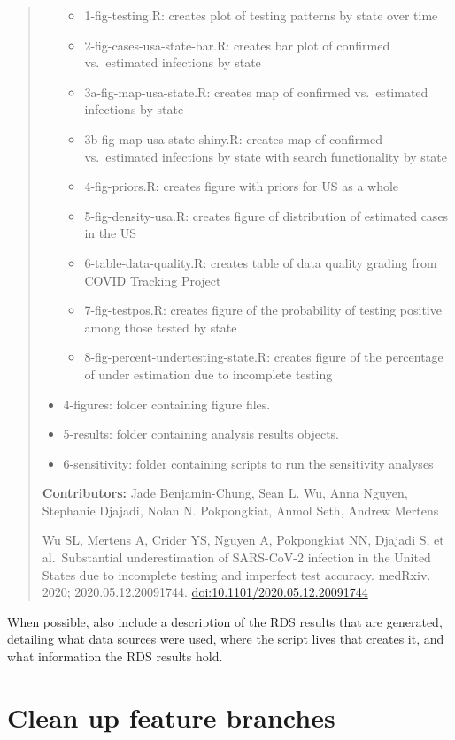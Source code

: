 \documentclass[
]{book}
\begin{document}
\begin{quote}
\begin{itemize}
  \begin{itemize}
  \item
    1-fig-testing.R: creates plot of testing patterns by state over time
  \item
    2-fig-cases-usa-state-bar.R: creates bar plot of confirmed vs.~estimated infections by state
  \item
    3a-fig-map-usa-state.R: creates map of confirmed vs.~estimated infections by state
  \item
    3b-fig-map-usa-state-shiny.R: creates map of confirmed vs.~estimated infections by state with search functionality by state
  \item
    4-fig-priors.R: creates figure with priors for US as a whole
  \item
    5-fig-density-usa.R: creates figure of distribution of estimated cases in the US
  \item
    6-table-data-quality.R: creates table of data quality grading from COVID Tracking Project
  \item
    7-fig-testpos.R: creates figure of the probability of testing positive among those tested by state
  \item
    8-fig-percent-undertesting-state.R: creates figure of the percentage of under estimation due to incomplete testing
  \end{itemize}
\item
  4-figures: folder containing figure files.
\item
  5-results: folder containing analysis results objects.
\item
  6-sensitivity: folder containing scripts to run the sensitivity analyses
\end{itemize}

\textbf{Contributors:} Jade Benjamin-Chung, Sean L. Wu, Anna Nguyen, Stephanie Djajadi, Nolan N. Pokpongkiat, Anmol Seth, Andrew Mertens

Wu SL, Mertens A, Crider YS, Nguyen A, Pokpongkiat NN, Djajadi S, et al.~Substantial underestimation of SARS-CoV-2 infection in the United States due to incomplete testing and imperfect test accuracy. medRxiv. 2020; 2020.05.12.20091744. \url{doi:10.1101/2020.05.12.20091744}
\end{quote}

When possible, also include a description of the RDS results that are generated, detailing what data sources were used, where the script lives that creates it, and what information the RDS results hold.

\section{Clean up feature branches}\label{clean-up-feature-branches}
\end{document}

